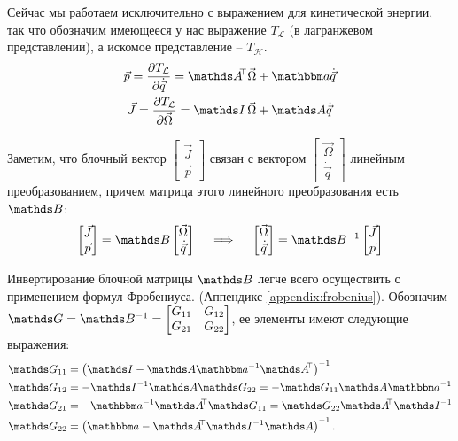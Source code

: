 Сейчас мы работаем исключительно с выражением для кинетической энергии, так что обозначим имеющееся у нас выражение $T_\mathcal{L}$ (в лагранжевом представлении), а искомое представление -- $T_\mathcal{H}$.
\vverh
\begin{gather}
\vec{p} = \frac{\partial T_\mathcal{L}}{\partial \dot{\vec{q}}} = \bbA^{\dn \top} \vec{\Omega} + \bba \dot{\vec{q}} \notag \\
\vec{J} = \frac{\partial T_\mathcal{L}}{\partial \vec{\Omega}} = \bbI \, \vec{\Omega} + \bbA \dot{\vec{q}} \notag
\end{gather}

Заметим, что блочный вектор $\begin{bmatrix} \vec{J} \\ \vec{p} \end{bmatrix}$ связан с вектором $\begin{bmatrix} \vec{\Omega} \\ \dot{\vec{q}} \end{bmatrix}$ линейным преобразованием, причем матрица этого линейного преобразования есть $\bbB$:
\vverh
\begin{gather}
\begin{bmatrix}
\vec{J} \\
\vec{p}
\end{bmatrix}
= \bbB
\begin{bmatrix}
\vec{\Omega} \\
\dot{\vec{q}}
\end{bmatrix}
\quad \implies \quad 
\begin{bmatrix}
\vec{\Omega} \\
\dot{\vec{q}}
\end{bmatrix}
= \bbB^{-1}
\begin{bmatrix}
\vec{J} \\
\vec{p}
\end{bmatrix} \notag
\end{gather}

Инвертирование блочной матрицы $\bbB$ легче всего осуществить с применением формул Фробениуса. (Аппендикс \ref{appendix:frobenius}).
Обозначим $\bbG = \bbB^{-1} = \begin{bmatrix} G_{11} & G_{12} \\ G_{21} & G_{22}
\end{bmatrix}$, ее элементы имеют следующие выражения:
\vverh
\begin{gather}
\begin{aligned}
\bbG_{11} &=  \lb \bbI - \bbA \bba^{-1} \bbA^{\dn \top} \rb^{-1} \\
\bbG_{12} &= - \bbI^{-1} \bbA \bbG_{22} = - \bbG_{11} \bbA \bba^{-1}\\
\bbG_{21} &= - \bba^{-1} \bbA^{\dn \top} \bbG_{11} = \bbG_{22} \bbA^{\dn \top} \bbI^{-1} \\
\bbG_{22} &= \lb \bba - \bbA^{\dn \top} \bbI^{-1} \bbA \rb^{-1}.
\end{aligned}
\notag
\end{gather}

